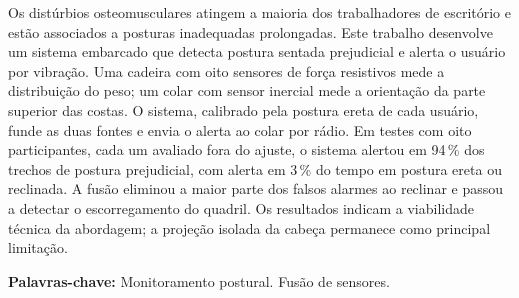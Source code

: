 Os distúrbios osteomusculares atingem a maioria dos trabalhadores de escritório e estão associados a posturas inadequadas prolongadas. Este trabalho desenvolve um sistema embarcado que detecta postura sentada prejudicial e alerta o usuário por vibração. Uma cadeira com oito sensores de força resistivos mede a distribuição do peso; um colar com sensor inercial mede a orientação da parte superior das costas. O sistema, calibrado pela postura ereta de cada usuário, funde as duas fontes e envia o alerta ao colar por rádio. Em testes com oito participantes, cada um avaliado fora do ajuste, o sistema alertou em 94\,\% dos trechos de postura prejudicial, com alerta em 3\,\% do tempo em postura ereta ou reclinada. A fusão eliminou a maior parte dos falsos alarmes ao reclinar e passou a detectar o escorregamento do quadril. Os resultados indicam a viabilidade técnica da abordagem; a projeção isolada da cabeça permanece como principal limitação.

\vspace{0.2cm}

\textbf{Palavras-chave:} Monitoramento postural. Fusão de sensores.

